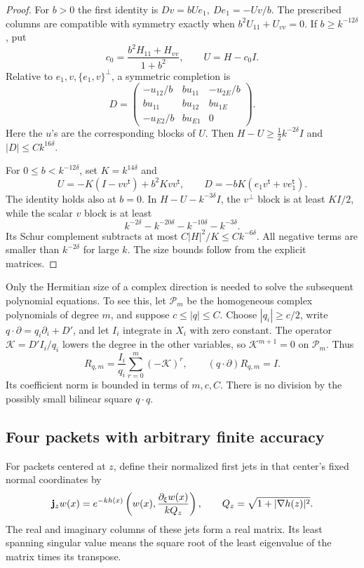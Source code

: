\begin{proof}
For \(b>0\) the first identity is
\(Dv=bUe_1,\ De_1=-Uv/b\). The prescribed columns are compatible
with symmetry exactly when \(b^2U_{11}+U_{vv}=0\).
If \(b\ge k^{-12\delta}\), put
\[
 c_0=\frac{b^2H_{11}+H_{vv}}{1+b^2},\qquad U=H-c_0I.
\]
Relative to \(e_1,v,\{e_1,v\}^{\perp}\), a symmetric completion is
\[
 D=\begin{pmatrix}
 -u_{12}/b&bu_{11}&-u_{2E}/b\\
 bu_{11}&bu_{12}&bu_{1E}\\
 -u_{E2}/b&bu_{E1}&0
 \end{pmatrix}.
\]
Here the \(u\)'s are the corresponding blocks of \(U\).
Then \(H-U\ge\tfrac12k^{-2\delta}I\) and
\(|D|\le Ck^{16\delta}\).

For \(0\le b<k^{-12\delta}\), set \(K=k^{14\delta}\) and
\[
 U=-K(I-vv^{\mathsf t})+b^2Kvv^{\mathsf t},\qquad
 D=-bK(e_1v^{\mathsf t}+ve_1^{\mathsf t}).
\]
The identity holds also at \(b=0\). In
\(H-U-k^{-3\delta}I\), the \(v^\perp\) block is at least
\(KI/2\), while the scalar \(v\) block is at least
\[
 k^{-2\delta}-k^{-20\delta}-k^{-10\delta}-k^{-3\delta}.
\]
Its Schur complement subtracts at most \(C|H|^2/K\le Ck^{-6\delta}\).
All negative terms are smaller than \(k^{-2\delta}\) for large \(k\).
The size bounds follow from the explicit matrices.
\end{proof}

Only the Hermitian size of a complex direction is needed to solve
the subsequent polynomial equations. To see this, let \(\mathcal P_m\)
be the homogeneous complex polynomials of degree \(m\), and suppose
\(c\le|q|\le C\). Choose \(|q_i|\ge c/2\), write
\(q\cdot\partial=q_i\partial_i+D'\), and let \(I_i\) integrate
in \(X_i\) with zero constant. The operator
\(\mathcal K=D'I_i/q_i\) lowers the degree in the other variables,
so \(\mathcal K^{m+1}=0\) on \(\mathcal P_m\). Thus
\begin{equation}\label{eq:polyinverse}
 R_{q,m}=\frac{I_i}{q_i}\sum_{r=0}^m(-\mathcal K)^r,\qquad
 (q\cdot\partial)R_{q,m}=I .
\end{equation}
Its coefficient norm is bounded in terms of \(m,c,C\).
There is no division by the possibly small bilinear square \(q\cdot q\).

\subsection{Four packets with arbitrary finite accuracy}

For packets centered at \(z\), define their normalized first jets
in that center's fixed normal coordinates by
\[
 {\bf j}_z w(x)=e^{-kh(x)}
       \left(w(x),\frac{\partial_\xi w(x)}{kQ_z}\right),
 \qquad Q_z=\sqrt{1+|\nabla h(z)|^2}.
\]
The real and imaginary columns of these jets form a real matrix.
Its least spanning singular value means the square root of the
least eigenvalue of the matrix times its transpose.

